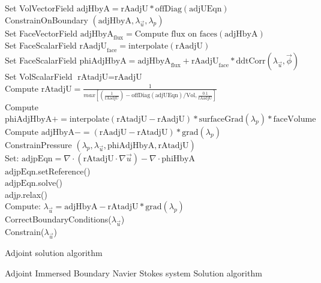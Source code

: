 \documentclass[10pt]{article} %
\begin{document}
\begin{center}
\begin{algorithm}[H]
{{{				Set VolVectorField $\text{adjHbyA} =  \text{rAadjU}*\text{offDiag}(\text{adjUEqn})$\\
				ConstrainOnBoundary $(\text{adjHbyA},\lambda_{\vec{u}},\lambda_p)$\\
				\quad Set FaceVectorField $\text{adjHbyA}_{\text{flux}} =  \text{Compute flux on faces}(\text{adjHbyA})$\\
				\quad Set FaceScalarField $\text{rAadjU}_{\text{face}} =  \text{interpolate}(\text{rAadjU})$\\
				Set FaceScalarField $\text{phiAdjHbyA} = \text{adjHbyA}_{\text{flux}} + \text{rAadjU}_{\text{face}}*\text{ddtCorr}(\lambda_{\vec{u}}, \vec{\phi}) $\\
				Set VolScalarField $\text{rAtadjU} = \text{rAadjU}$\\
				{
					Compute $\text{rAtadjU} =  \frac{1}{max\left[(\frac{1}{\text{rAadjU}}) - \text{offDiag}(\text{adjUEqn})/\text{Vol} , \frac{0.1}{\text{rAadjU}}\right]} $\\
					Compute $\text{phiAdjHbyA} += \text{interpolate}(\text{rAtadjU}-\text{rAadjU})*\text{surfaceGrad}(\lambda_p)*\text{faceVolume}$\\
					Compute $\text{adjHbyA} -=  \left(\text{rAadjU}-\text{rAtadjU}\right)*\text{grad}(\lambda_p)$\\
				}
				ConstrainPressure $(\lambda_p,\lambda_{\vec{u}},\text{phiAdjHbyA},\text{rAtadjU})$\\
				{
					Set: $\text{adjpEqn} = \nabla \cdot \left(\text{rAtadjU} \cdot \nabla \vec{u}\right)-\nabla \cdot \text{phiHbyA}$\\
					$\text{adjpEqn}.$setReference()\\
					$\text{adjpEqn}.$solve()\\
				}
				adj$p.$relax()\\
				Compute: $\lambda_{\vec{u}} = \text{adjHbyA} - \text{rAtadjU}*\text{grad}(\lambda_p)$\\
				CorrectBoundaryConditions($\lambda_{\vec{u}}$)\\
				Constrain($\lambda_{\vec{u}}$)
			}
		}
	}
	\caption{Adjoint solution algorithm}
\end{algorithm}
\newpage
	
\begin{flushleft}
	Adjoint Immersed Boundary Navier Stokes system Solution algorithm
\end{flushleft}



\end{center}
\end{document}
